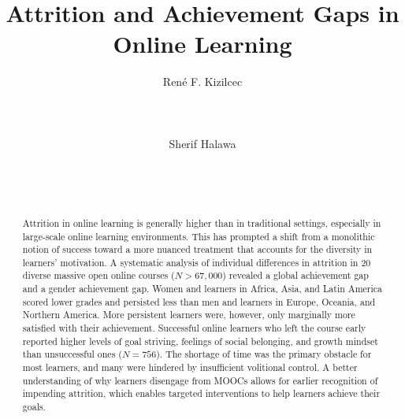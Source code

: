 \documentclass{sigchi}\usepackage[]{graphicx}\usepackage[]{color}
\begin{document}
\title{Attrition and Achievement Gaps in Online Learning}

\author{
  \alignauthor Ren\'{e} F. Kizilcec\\
    \\
    \\
    \\
  \alignauthor Sherif Halawa\\
    \\
    \\
    \\
}

\maketitle

\begin{abstract}
Attrition in online learning is generally higher than in traditional settings, especially in large-scale online learning environments. This has prompted a shift from a monolithic notion of success toward a more nuanced treatment that accounts for the diversity in learners' motivation.
A systematic analysis of individual differences in attrition in 20 diverse massive open online courses ($N>67,000$) revealed a global achievement gap and a gender achievement gap. Women and learners in Africa, Asia, and Latin America scored lower grades and persisted less than men and learners in Europe, Oceania, and Northern America. More persistent learners were, however, only marginally more satisfied with their achievement. 
Successful online learners who left the course early reported higher levels of goal striving, feelings of social belonging, and growth mindset than unsuccessful ones ($N=756$). The shortage of time was the primary obstacle for most learners, and many were hindered by insufficient volitional control.
A better understanding of why learners disengage from MOOCs allows for earlier recognition of impending attrition, which enables targeted interventions to help learners achieve their goals.
\end{abstract}


\end{document}
